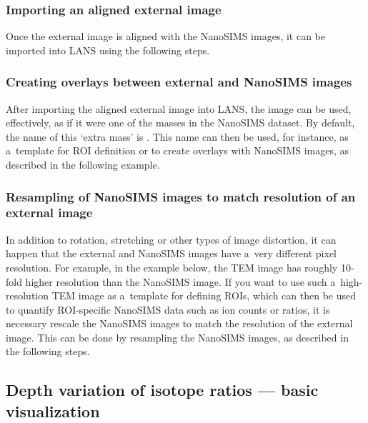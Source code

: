 \s 

\subsubsection{Importing an aligned external image}
\setcounter{step}{0}

Once the external image is aligned with the NanoSIMS images, it can be imported into LANS using the following steps.

\s

\subsubsection{Creating overlays between external and NanoSIMS images}
\setcounter{step}{0}

After importing the aligned external image into LANS, the image can be used, effectively, as if it were one of the masses in the NanoSIMS dataset. By default, the name of this `extra mass' is . This name can then be used, for instance, as a~template for ROI definition or to create overlays with NanoSIMS images, as described in the following example.

\s

\subsubsection{Resampling of NanoSIMS images to match resolution of an external image}
\setcounter{step}{0}

In addition to rotation, stretching or other types of image distortion, it can happen that the external and NanoSIMS images have a~very different pixel resolution. For example, in the example below, the TEM image has roughly 10-fold higher resolution than the NanoSIMS image. If you want to use such a~high-resolution TEM image as a~template for defining ROIs, which can then be used to quantify ROI-specific NanoSIMS data such as ion counts or ratios, it is necessary rescale the NanoSIMS images to match the resolution of the external image. This can be done by resampling the NanoSIMS images, as described in the following steps.

\s


\subsection{Depth variation of isotope ratios --- basic visualization}
\setcounter{step}{0}

